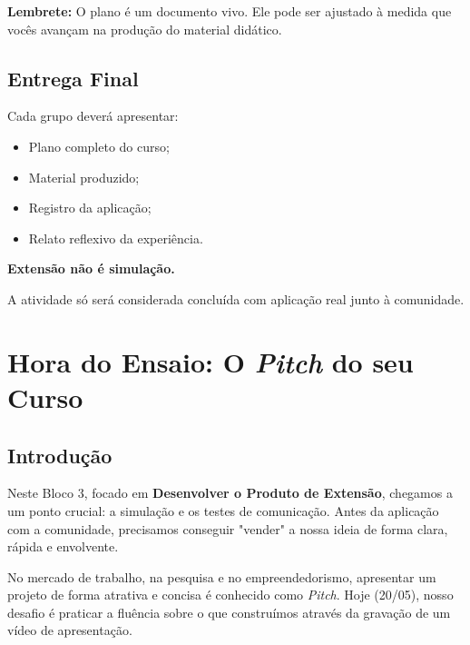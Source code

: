 \documentclass[12pt,a4paper]{article}
\begin{document}
\begin{boxObservacao}
\textbf{Lembrete:} O plano é um documento vivo. Ele pode ser ajustado à medida que vocês avançam na produção do material didático.
\end{boxObservacao}


\subsection{Entrega Final}

Cada grupo deverá apresentar:

\begin{itemize}
    \item Plano completo do curso;
    \item Material produzido;
    \item Registro da aplicação;
    \item Relato reflexivo da experiência.
\end{itemize}

\begin{boxObservacao}
\textbf{Extensão não é simulação.}

A atividade só será considerada concluída com aplicação real junto à comunidade.
\end{boxObservacao}


\section{Hora do Ensaio: O \textit{Pitch} do seu Curso}

\subsection*{Introdução}

Neste Bloco 3, focado em \textbf{Desenvolver o Produto de Extensão}, chegamos a um ponto crucial: a simulação e os testes de comunicação. Antes da aplicação com a comunidade, precisamos conseguir "vender" a nossa ideia de forma clara, rápida e envolvente. 

No mercado de trabalho, na pesquisa e no empreendedorismo, apresentar um projeto de forma atrativa e concisa é conhecido como \textit{Pitch}. Hoje (20/05), nosso desafio é praticar a fluência sobre o que construímos através da gravação de um vídeo de apresentação.
\end{document}
